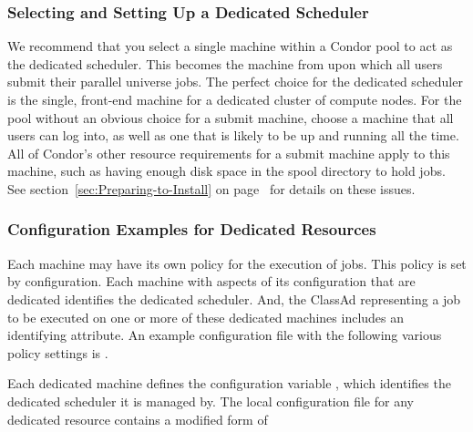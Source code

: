 \subsubsection{\label{sec:Setup-Dedicated-Scheduler}
Selecting and Setting Up a Dedicated Scheduler}

We recommend that you select a single machine within a 
Condor pool to act as the dedicated scheduler.
This becomes the machine from upon which all users submit their 
parallel universe jobs.
The perfect choice for the dedicated scheduler 
is the single, front-end machine for
a dedicated cluster of compute nodes.
For the pool without an obvious choice for a submit machine,
choose a machine that all users can log into, as well as one
that is likely to be up and running all the time.
All of Condor's other resource requirements for a submit machine apply to
this machine, such as having enough disk space in the spool
directory to hold jobs. See section~\ref{sec:Preparing-to-Install} on
page~\pageref{sec:Preparing-to-Install} for details on these issues. 


\subsubsection{\label{sec:Configure-Dedicated-Resource}
Configuration Examples for Dedicated Resources} 

Each machine may have its own policy for the execution of jobs.
This policy is set by configuration.
Each machine with aspects of its configuration that are dedicated
identifies the dedicated scheduler.
And, the ClassAd representing a job to be executed on
one or more of these dedicated machines includes an identifying attribute.
An example configuration file with the following various policy settings
is .

Each dedicated machine defines the configuration variable
, which identifies
the dedicated scheduler it is managed by.
The local configuration file for any dedicated resource contains
a modified form of

